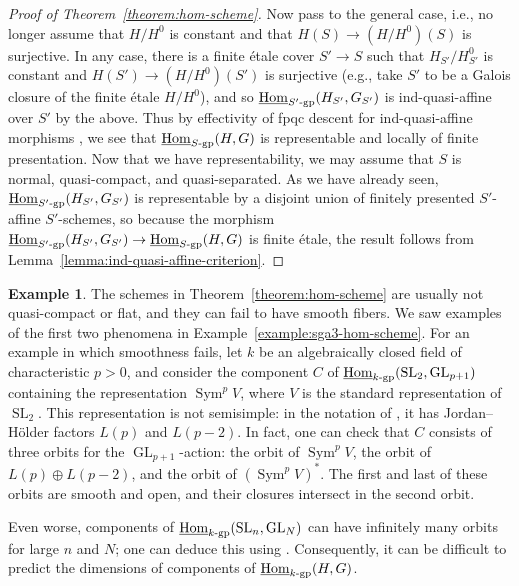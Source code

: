 \documentclass[11pt, letterpaper,english]{amsart}
\theoremstyle{plain}
\theoremstyle{definition}
\newtheorem{example}[lem]{Example}
\numberwithin{equation}{section}
\numberwithin{lem}{section}
\DeclareMathOperator{\Hom}{Hom}
\DeclareMathOperator{\Sym}{Sym}
\DeclareMathOperator{\GL}{GL}
\DeclareMathOperator{\SL}{SL}
\begin{document}
\begin{proof}[Proof of Theorem~\ref{theorem:hom-scheme}]
Now pass to the general case, i.e., no longer assume that $H/H^0$ is constant and that $H(S) \to (H/H^0)(S)$ is surjective. In any case, there is a finite \'{e}tale cover $S' \to S$ such that $H_{S'}/H_{S'}^0$ is constant and $H(S') \to (H/H^0)(S')$ is surjective (e.g., take $S'$ to be a Galois closure of the finite \'etale $H/H^0$), and so $\underline{\Hom}_{S'\textrm{-}\rm{gp}}(H_{S'}, G_{S'})$ is ind-quasi-affine over $S'$ by the above. Thus by effectivity of fpqc descent for ind-quasi-affine morphisms \cite[\href{https://stacks.math.columbia.edu/tag/0APK}{Tag 0APK}]{stacks-project}, we see that $\underline{\Hom}_{S\textrm{-}\rm{gp}}(H, G)$ is representable and locally of finite presentation. Now that we have representability, we may assume that $S$ is normal, quasi-compact, and quasi-separated. As we have already seen, $\underline{\Hom}_{S'\textrm{-}\rm{gp}}(H_{S'}, G_{S'})$ is representable by a disjoint union of finitely presented $S'$-affine $S'$-schemes, so because the morphism $\underline{\Hom}_{S'\textrm{-}\rm{gp}}(H_{S'}, G_{S'}) \to \underline{\Hom}_{S\textrm{-}\rm{gp}}(H, G)$ is finite \'etale, the result follows from Lemma~\ref{lemma:ind-quasi-affine-criterion}.
\end{proof}

\begin{example}\label{example:hom-scheme-pathologies}
The schemes in Theorem~\ref{theorem:hom-scheme} are usually not quasi-compact or flat, and they can fail to have smooth fibers. We saw examples of the first two phenomena in Example~\ref{example:sga3-hom-scheme}. For an example in which smoothness fails, let $k$ be an algebraically closed field of characteristic $p > 0$, and consider the component $C$ of $\underline{\Hom}_{k\textrm{-}\rm{gp}}(\SL_2, \GL_{p+1})$ containing the representation $\Sym^p V$, where $V$ is the standard representation of $\SL_2$. This representation is not semisimple: in the notation of \cite[II, Chapter 2]{Jantzen}, it has Jordan--H\"older factors $L(p)$ and $L(p-2)$. In fact, one can check that $C$ consists of three orbits for the $\GL_{p+1}$-action: the orbit of $\Sym^p V$, the orbit of $L(p) \oplus L(p-2)$, and the orbit of $(\Sym^p V)^*$. The first and last of these orbits are smooth and open, and their closures intersect in the second orbit.

Even worse, components of $\underline{\Hom}_{k\textrm{-}\rm{gp}}(\SL_n, \GL_N)$ can have infinitely many orbits for large $n$ and $N$; one can deduce this using \cite[Theorem 5.2]{Scott-Xi}. Consequently, it can be difficult to predict the dimensions of components of $\underline{\Hom}_{k\textrm{-}\rm{gp}}(H, G)$. 
\end{example}
\end{document}
